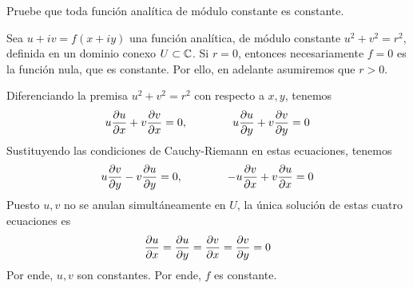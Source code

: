 \begin{exercise}
Pruebe que toda función analítica de módulo constante es constante.
\end{exercise}

\begin{solution}
Sea $u + iv = f(x + iy)$ una función analítica, de módulo constante $u^2 + v^2 = r^2$, definida en un dominio conexo $U \subset \mathbb C$. Si $r = 0$, entonces necesariamente $f = 0$ es la función nula, que es constante. Por ello, en adelante asumiremos que $r > 0$.

Diferenciando la premisa $u^2 + v^2 = r^2$ con respecto a $x, y$, tenemos
$$u \dfrac {\partial u} {\partial x} + v \dfrac {\partial v} {\partial x} = 0, \qquad \qquad u \dfrac {\partial u} {\partial y} + v \dfrac {\partial v} {\partial y} = 0$$
Sustituyendo las condiciones de Cauchy-Riemann en estas ecuaciones, tenemos
$$u \dfrac {\partial v} {\partial y} - v \dfrac {\partial u} {\partial y} = 0, \qquad \qquad -u \dfrac {\partial v} {\partial x} + v \dfrac {\partial u} {\partial x} = 0$$
Puesto $u, v$ no se anulan simultáneamente en $U$, la única solución de estas cuatro ecuaciones es
$$\dfrac {\partial u} {\partial x} = \dfrac {\partial u} {\partial y} = \dfrac {\partial v} {\partial x} = \dfrac {\partial v} {\partial y} = 0$$
Por ende, $u, v$ son constantes. Por ende, $f$ es constante.
\end{solution}
